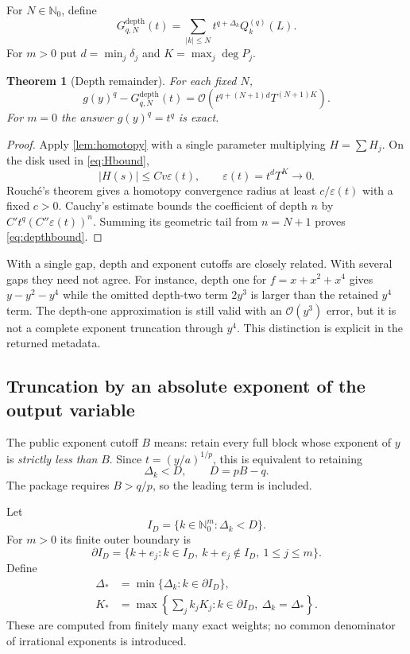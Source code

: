 \documentclass[11pt,a4paper]{article}
\newtheorem{theorem}{Theorem}[section]
\theoremstyle{definition}
\theoremstyle{remark}
\newcommand{\OO}{\mathcal O}
\newcommand{\NN}{\mathbb N_0}
\begin{document}
For $N\in\NN$, define
\[
 G_{q,N}^{\mathrm{depth}}(t)
 =\sum_{|k|\le N}t^{q+\Delta_k}Q_k^{(q)}(L).
\]
For $m>0$ put $d=\min_j\delta_j$ and $K=\max_j\deg P_j$.

\begin{theorem}[Depth remainder]\label{thm:depth}
For each fixed $N$,
\begin{equation}\label{eq:depthbound}
 g(y)^q-G_{q,N}^{\mathrm{depth}}(t)
 =\OO\left(t^{q+(N+1)d}T^{(N+1)K}\right).
\end{equation}
For $m=0$ the answer $g(y)^q=t^q$ is exact.
\end{theorem}

\begin{proof}
Apply \cref{lem:homotopy} with a single parameter multiplying $H=\sum H_j$.
On the disk used in \eqref{eq:Hbound},
\[
 |H(s)|\le C v\varepsilon(t),\qquad
 \varepsilon(t)=t^dT^K\longrightarrow0.
\]
Rouch\'e's theorem gives a homotopy convergence radius at least
$c/\varepsilon(t)$ with a fixed $c>0$. Cauchy's estimate bounds the coefficient
of depth $n$ by $C't^q(C''\varepsilon(t))^n$. Summing its geometric tail from
$n=N+1$ proves \eqref{eq:depthbound}.
\end{proof}

With a single gap, depth and exponent cutoffs are closely related. With
several gaps they need not agree. For instance, depth one for
$f=x+x^2+x^4$ gives $y-y^2-y^4$ while the omitted depth-two term $2y^3$ is larger
than the retained $y^4$ term. The depth-one approximation is still valid with
an $\OO(y^3)$ error, but it is not a complete exponent truncation through
$y^4$. This distinction is explicit in the returned metadata.

\subsection{Truncation by an absolute exponent of the output variable}

The public exponent cutoff $B$ means: retain every full block whose exponent
of $y$ is \emph{strictly less than} $B$. Since $t=(y/a)^{1/p}$, this is equivalent
to retaining
\[
 \Delta_k<D,\qquad D=pB-q.
\]
The package requires $B>q/p$, so the leading term is included.

Let
\[
 I_D=\{k\in\NN^m:\Delta_k<D\}.
\]
For $m>0$ its finite outer boundary is
\begin{equation}\label{eq:boundary}
 \partial I_D=\{k+e_j:k\in I_D,\ k+e_j\notin I_D,\ 1\le j\le m\}.
\end{equation}
Define
\begin{align}
 \Delta_*&=\min\{\Delta_k:k\in\partial I_D\},\label{eq:frontiermin}\\
 K_*&=\max\left\{\sum_jk_jK_j:
               k\in\partial I_D,\ \Delta_k=\Delta_*\right\}.
 \label{eq:frontierdegree}
\end{align}
These are computed from finitely many exact weights; no common denominator of
irrational exponents is introduced.
\end{document}
